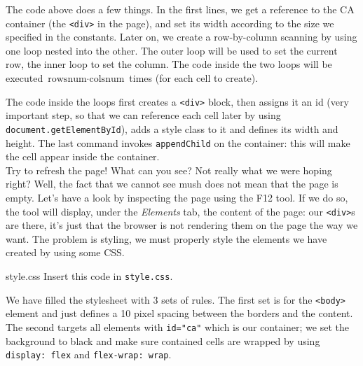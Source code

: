 The code above does a few things. In the first lines, we get a reference to the CA container
(the \texttt{<div>} in the page), and set its width according to the size we specified in the
constants. Later on, we create a row-by-column scanning by using one loop nested into the other.
The outer loop will be used to set the current row, the inner loop to set the column. The code
inside the two loops will be executed $\text{rowsnum} \cdot \text{colsnum}$ times
(for each cell to create).

The code inside the loops first creates a \texttt{<div>} block, then assigns it an id (very
important step, so that we can reference each cell later
by using \texttt{document.getElementById}), adds a style class to it and defines its width and height.
The last command invokes \texttt{appendChild} on the container: this will make the cell appear
inside the container.\\

Try to refresh the page! What can you see? Not really what we were hoping right? Well, the fact that
we cannot see mush does not mean that the page is empty. Let's have a look by inspecting the page
using the F12 tool. If we do so, the tool will display, under the \textit{Elements} tab, the
content of the page: our \texttt{<div>}s are there, it's just that the browser is not rendering
them on the page the way we want. The problem is styling, we must properly style the elements we
have created by using some CSS.

\begin{programcode}{style.css}
Insert this code in \texttt{style.css}.
\end{programcode}

We have filled the stylesheet with 3 sets of rules. The first set is for the \texttt{<body>} element
and just defines a 10 pixel spacing between the borders and the content. The second targets
all elements with \texttt{id="ca"} which is our container; we set the background to black and
make sure contained cells are wrapped by using \texttt{display: flex} and \texttt{flex-wrap: wrap}.

